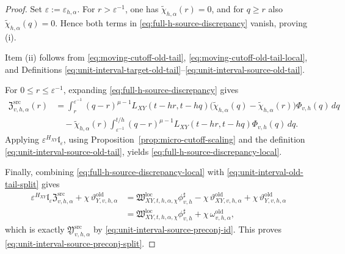 \documentclass[11pt,a4paper]{amsart}
\theoremstyle{plain}
\theoremstyle{definition}
\theoremstyle{remark}
\begin{document}
\begin{proof}
Set \(\varepsilon:=\varepsilon_{h,\alpha}\). For \(r>\varepsilon^{-1}\), one has
\(\widetilde\chi_{h,\alpha}(r)=0\), and for \(q\ge r\) also \(\widetilde\chi_{h,\alpha}(q)=0\). Hence
both terms in \eqref{eq:full-h-source-discrepancy} vanish, proving (i).

Item (ii) follows from \eqref{eq:moving-cutoff-old-tail},
\eqref{eq:moving-cutoff-old-tail-local}, and Definitions
\eqref{eq:unit-interval-target-old-tail}--\eqref{eq:unit-interval-source-old-tail}.

For \(0\le r\le \varepsilon^{-1}\), expanding \eqref{eq:full-h-source-discrepancy} gives
\begin{align*}
\mathfrak Z_{v,h,\alpha}^{\mathrm{src}}(r)
&=
\int_r^{\varepsilon^{-1}}
(q-r)^{\mu-1}
L_{XY}(t-hr,t-hq)
\bigl(
\widetilde\chi_{h,\alpha}(q)-\widetilde\chi_{h,\alpha}(r)
\bigr)
\Phi_{v,h}(q)\,dq\\
&\quad-
\widetilde\chi_{h,\alpha}(r)
\int_{\varepsilon^{-1}}^{t/h}
(q-r)^{\mu-1}
L_{XY}(t-hr,t-hq)\Phi_{v,h}(q)\,dq.
\end{align*}
Applying \(\varepsilon^{H_{XY}}\mathfrak l_{\varepsilon}\), using
Proposition~\ref{prop:micro-cutoff-scaling} and the definition
\eqref{eq:unit-interval-source-old-tail}, yields
\eqref{eq:full-h-source-discrepancy-local}.

Finally, combining \eqref{eq:full-h-source-discrepancy-local} with
\eqref{eq:unit-interval-old-tail-split} gives
\begin{align*}
\varepsilon^{H_{XY}}\mathfrak l_{\varepsilon}\mathfrak Z_{v,h,\alpha}^{\mathrm{src}}
+
\chi\,\vartheta_{Y,v,h,\alpha}^{\mathrm{old}}
&=
\mathfrak W_{XY,t,h,\alpha,\chi}^{\mathrm{loc}}\phi_{v,h}^{\sharp}
-
\chi\,\vartheta_{XY,v,h,\alpha}^{\mathrm{old}}
+
\chi\,\vartheta_{Y,v,h,\alpha}^{\mathrm{old}}\\
&=
\mathfrak W_{XY,t,h,\alpha,\chi}^{\mathrm{loc}}\phi_{v,h}^{\sharp}
+
\chi\,\omega_{v,h,\alpha}^{\mathrm{old}},
\end{align*}
which is exactly \(\mathfrak Y_{v,h,\alpha}^{\mathrm{src}}\) by
\eqref{eq:unit-interval-source-preconj-id}. This proves \eqref{eq:unit-interval-source-preconj-split}.
\end{proof}
\end{document}
